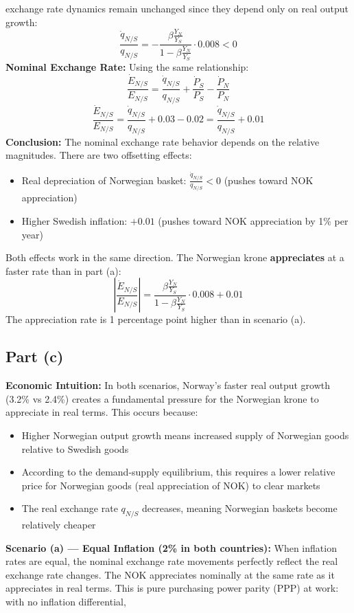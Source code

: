 exchange rate dynamics remain unchanged since they depend only on real output
growth: \[ \frac{\dot{q}_{N/S}}{q_{N/S}} = -\frac{\beta \frac{Y_N}{Y_S}}{1 -
\beta \frac{Y_N}{Y_S}} \cdot 0.008 < 0 \] \textbf{Nominal Exchange Rate:} Using
the same relationship: \[ \frac{\dot{E}_{N/S}}{E_{N/S}} =
\frac{\dot{q}_{N/S}}{q_{N/S}} + \frac{\dot{P}_S}{P_S} - \frac{\dot{P}_N}{P_N} \]
\[ \frac{\dot{E}_{N/S}}{E_{N/S}} = \frac{\dot{q}_{N/S}}{q_{N/S}} + 0.03 - 0.02 =
\frac{\dot{q}_{N/S}}{q_{N/S}} + 0.01 \] \textbf{Conclusion:} The nominal
exchange rate behavior depends on the relative magnitudes. There are two
offsetting effects: \begin{itemize} \item Real depreciation of Norwegian basket:
$\frac{\dot{q}_{N/S}}{q_{N/S}} < 0$ (pushes toward NOK appreciation) \item
Higher Swedish inflation: $+0.01$ (pushes toward NOK appreciation by 1\% per
year) \end{itemize} Both effects work in the same direction. The Norwegian krone
\textbf{appreciates} at a faster rate than in part (a): \[
\left|\frac{\dot{E}_{N/S}}{E_{N/S}}\right| = \frac{\beta \frac{Y_N}{Y_S}}{1 -
\beta \frac{Y_N}{Y_S}} \cdot 0.008 + 0.01 \] The appreciation rate is 1
percentage point higher than in scenario (a). \subsection{Part (c)}
\textbf{Economic Intuition:} In both scenarios, Norway's faster real output
growth (3.2\% vs 2.4\%) creates a fundamental pressure for the Norwegian krone
to appreciate in real terms. This occurs because: \begin{itemize} \item Higher
Norwegian output growth means increased supply of Norwegian goods relative to
Swedish goods \item According to the demand-supply equilibrium, this requires a
lower relative price for Norwegian goods (real appreciation of NOK) to clear
markets \item The real exchange rate $q_{N/S}$ decreases, meaning Norwegian
baskets become relatively cheaper \end{itemize} \textbf{Scenario (a) --- Equal
Inflation (2\% in both countries):} When inflation rates are equal, the nominal
exchange rate movements perfectly reflect the real exchange rate changes. The
NOK appreciates nominally at the same rate as it appreciates in real terms. This
is pure purchasing power parity (PPP) at work: with no inflation differential,
